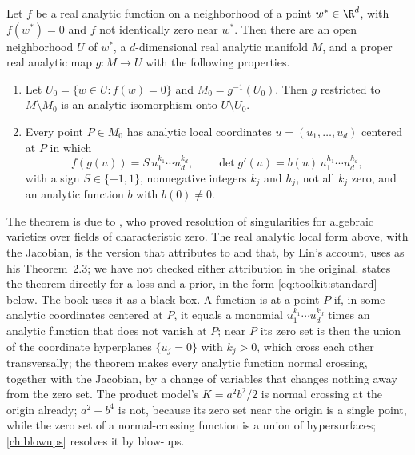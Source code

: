 \begin{refsection}
\begin{theorem}\label{thm:toolkit:hironaka}
Let $f$ be a real analytic function on a neighborhood of a point $w^*\in\R^d$, with $f(w^*)=0$ and $f$ not identically zero near $w^*$. Then there are an open neighborhood $U$ of $w^*$, a $d$-dimensional real analytic manifold $M$, and a proper real analytic map $g\colon M\to U$ with the following properties.
\begin{enumerate}
\item Let $U_0=\{w\in U:f(w)=0\}$ and $M_0=g^{-1}(U_0)$. Then $g$ restricted to $M\setminus M_0$ is an analytic isomorphism onto $U\setminus U_0$.
\item Every point $P\in M_0$ has analytic local coordinates $u=(u_1,\dots,u_d)$ centered at $P$ in which
\[
f(g(u))=S\,u_1^{k_1}\cdots u_d^{k_d},\qquad\det g'(u)=b(u)\,u_1^{h_1}\cdots u_d^{h_d},
\]
with a sign $S\in\{-1,1\}$, nonnegative integers $k_j$ and $h_j$, not all $k_j$ zero, and an analytic function $b$ with $b(0)\ne0$.
\end{enumerate}
\end{theorem}

The theorem is due to \textcite{Hironaka1964a,Hironaka1964b}, who proved resolution of singularities for algebraic varieties over fields of characteristic zero. The real analytic local form above, with the Jacobian, is the version that \textcite[Theorem~3.3]{Lin2011} attributes to \textcite{Atiyah1970} and that, by Lin's account, \textcite{Watanabe2009} uses as his Theorem~2.3; we have not checked either attribution in the original. \Textcite[Section~3]{Watanabe2024} states the theorem directly for a loss and a prior, in the form \eqref{eq:toolkit:standard} below. The book uses it as a black box. A function is  at a point $P$ if, in some analytic coordinates centered at $P$, it equals a monomial $u_1^{k_1}\cdots u_d^{k_d}$ times an analytic function that does not vanish at $P$; near $P$ its zero set is then the union of the coordinate hyperplanes $\{u_j=0\}$ with $k_j>0$, which cross each other transversally; the theorem makes every analytic function normal crossing, together with the Jacobian, by a change of variables that changes nothing away from the zero set. The product model's $K=a^2b^2/2$ is normal crossing at the origin already; $a^2+b^4$ is not, because its zero set near the origin is a single point, while the zero set of a normal-crossing function is a union of hypersurfaces; \cref{ch:blowups} resolves it by blow-ups.


\end{refsection}
